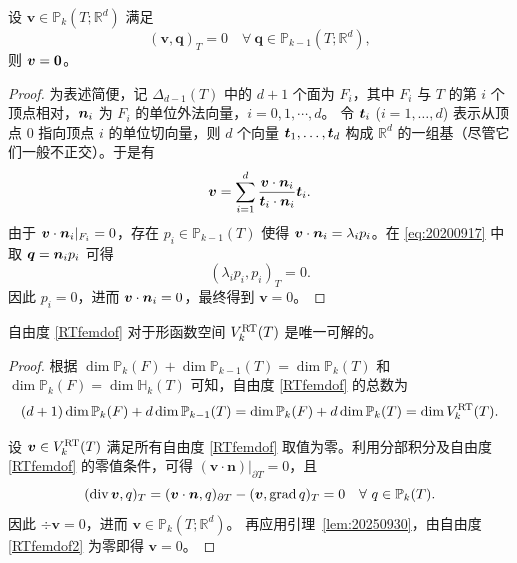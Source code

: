 \begin{lemma}\label{lem:20250930}
设 $\boldsymbol{v}\in \mathbb P_{k}(T; \mathbb R^d)$ 满足
\begin{equation}\label{eq:20200917}
(\boldsymbol v, \boldsymbol q)_T =0 \quad \forall~\boldsymbol q\in\mathbb P_{k-1}(T; \mathbb R^d),
\end{equation}
则 $\boldsymbol v=\boldsymbol 0$。
\end{lemma}
\begin{proof}
为表述简便，记 $\Delta_{d-1}(T)$ 中的 $d+1$ 个面为 $F_i$，其中 $F_i$ 与 $T$ 的第 $i$ 个顶点相对，$\boldsymbol n_i$ 为 $F_i$ 的单位外法向量，$i=0,1,\cdots,d$。
令 $\boldsymbol t_i$ ($i=1,\ldots,d$) 表示从顶点 $0$ 指向顶点 $i$ 的单位切向量，则 $d$ 个向量 ${\boldsymbol t_1, \ldots, \boldsymbol t_d}$ 构成 $\mathbb R^d$ 的一组基（尽管它们一般不正交）。于是有
\[
\boldsymbol v=\sum_{i=1}^d\frac{\boldsymbol v\cdot\boldsymbol n_i}{\boldsymbol t_i\cdot\boldsymbol n_i}\boldsymbol t_i.
\]
由于 $\boldsymbol v\cdot\boldsymbol n_i|_{F_i}=0$，存在 $p_i\in\mathbb P_{k-1}(T)$ 使得 $\boldsymbol v\cdot\boldsymbol n_i=\lambda_ip_i$。在 \eqref{eq:20200917} 中取 $\boldsymbol q=\boldsymbol n_ip_i$ 可得
\[
(\lambda_ip_i, p_i)_T =0.
\]
因此 $p_i=0$，进而 $\boldsymbol v\cdot\boldsymbol n_i=0$，最终得到 $\boldsymbol v= 0$。
\end{proof}

\begin{lemma}\label{lem:unisovlenRTfem}
自由度 \eqref{RTfemdof} 对于形函数空间 $V_k^{\rm RT}(T)$ 是唯一可解的。
\end{lemma}
\begin{proof}
根据 $\dim\mathbb P_{k}(F)+\dim\mathbb P_{k-1}(T)=\dim\mathbb P_{k}(T)$ 和 $\dim\mathbb P_{k}(F)=\dim \mathbb H_{k}(T)$ 可知，自由度 \eqref{RTfemdof} 的总数为
\begin{equation*}
(d+1)\dim\mathbb P_{k}(F)+d\dim\mathbb P_{k-1}(T) = \dim\mathbb P_{k}(F)+d\dim\mathbb P_{k}(T) = \dim V_k^{\rm RT}(T).
\end{equation*}

设 $\boldsymbol{v}\in V_k^{\rm RT}(T)$ 满足所有自由度 \eqref{RTfemdof} 取值为零。利用分部积分及自由度 \eqref{RTfemdof} 的零值条件，可得 $(\boldsymbol{v}\cdot\boldsymbol{n})|_{\partial T}=0$，且 
\begin{equation*}
(\operatorname{div}\boldsymbol{v}, q)_T=(\boldsymbol{v}\cdot\boldsymbol{n},q)_{\partial T} - (\boldsymbol{v},\operatorname{grad} q)_T=0\quad\forall~q\in \mathbb P_{k}(T).
\end{equation*}
因此 $\div\boldsymbol{v}=0$，进而 $\boldsymbol{v}\in \mathbb P_{k}(T; \mathbb R^d)$。
再应用引理~\ref{lem:20250930}，由自由度 \eqref{RTfemdof2} 为零即得 $\boldsymbol{v}=0$。
\end{proof}

